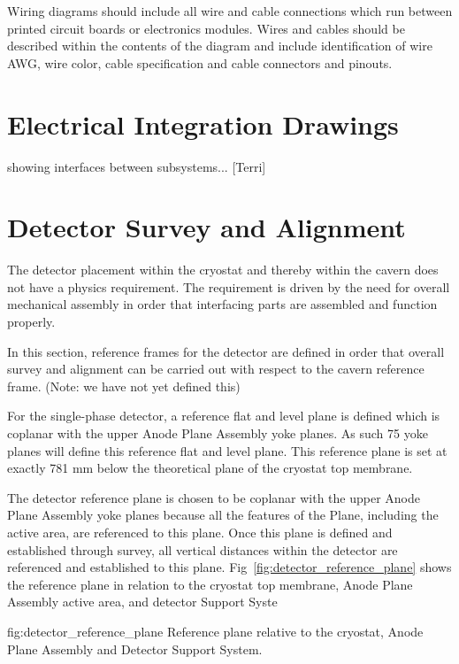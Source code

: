 Wiring diagrams should include all wire and cable connections which
run between printed circuit boards or electronics modules.  Wires and
cables should be described within the contents of the diagram and
include identification of wire AWG, wire color, cable specification
and cable connectors and pinouts.


\section{Electrical Integration Drawings}
\label{sec:fdsp-coord-integ-electrical}
showing interfaces between subsystems... [Terri]


\section{Detector Survey and Alignment}
\label{sec:fdsp-coord-integ-survey}
The detector placement within the cryostat and thereby within the
cavern does not have a physics requirement. The requirement is driven
by the need for overall mechanical assembly in order that interfacing
parts are assembled and function properly.

In this section, reference frames for the detector are defined in order
that overall survey and alignment can be carried out with respect to
the cavern reference frame. (Note: we have not yet defined this)

For the single-phase detector, a reference flat and level plane is
defined which is coplanar with the upper Anode Plane Assembly yoke
planes. As such 75 yoke planes will define this reference flat and
level plane. This reference plane is set at exactly 781 mm below the
theoretical plane of the cryostat top membrane.

The detector reference plane is chosen to be coplanar with the upper
Anode Plane Assembly yoke planes because all the features of the
Plane, including the active area, are referenced to this plane.  Once
this plane is defined and established through survey, all vertical
distances within the detector are referenced and established to this
plane.  Fig~\ref{fig:detector_reference_plane} shows the reference
plane in relation to the cryostat top membrane, Anode Plane Assembly
active area, and detector Support Syste
\begin{dunefigure}{fig:detector_reference_plane}
  {Reference plane relative to the cryostat, Anode Plane Assembly and Detector Support System.}
\end{dunefigure}

